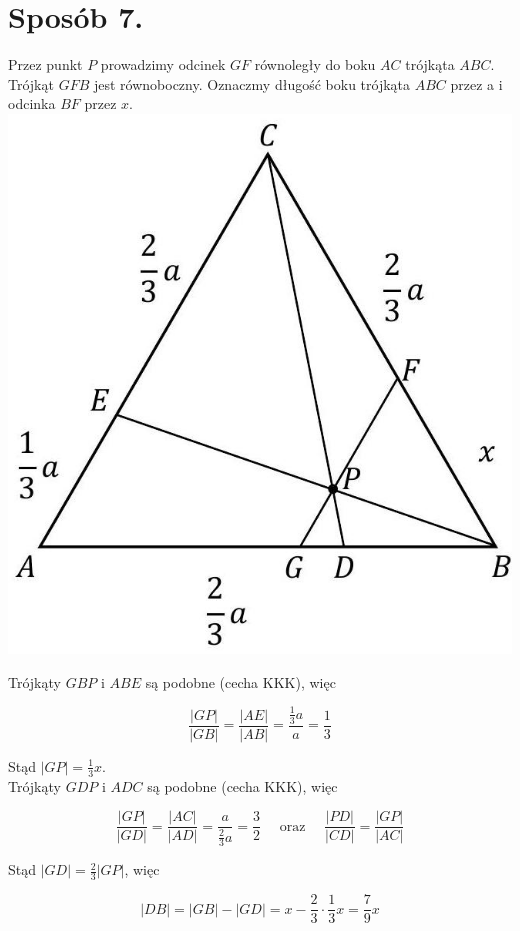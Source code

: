 \documentclass[10pt]{article}
\begin{document}
\section*{Sposób 7.}
Przez punkt $P$ prowadzimy odcinek $G F$ równoległy do boku $A C$ trójkąta $A B C$. Trójkąt $G F B$ jest równoboczny. Oznaczmy długość boku trójkąta $A B C$ przez a i odcinka $B F$ przez $x$.\\
\includegraphics[max width=\textwidth, center]{2025_02_07_36131546116d12814c9cg-17}

Trójkąty $G B P$ i $A B E$ są podobne (cecha KKK), więc

$$
\frac{|G P|}{|G B|}=\frac{|A E|}{|A B|}=\frac{\frac{1}{3} a}{a}=\frac{1}{3}
$$

Stąd $|G P|=\frac{1}{3} x$.\\
Trójkąty $G D P$ i $A D C$ są podobne (cecha KKK), więc

$$
\frac{|G P|}{|G D|}=\frac{|A C|}{|A D|}=\frac{a}{\frac{2}{3} a}=\frac{3}{2} \quad \text { oraz } \quad \frac{|P D|}{|C D|}=\frac{|G P|}{|A C|}
$$

Stąd $|G D|=\frac{2}{3}|G P|$, więc

$$
|D B|=|G B|-|G D|=x-\frac{2}{3} \cdot \frac{1}{3} x=\frac{7}{9} x
$$
\end{document}
